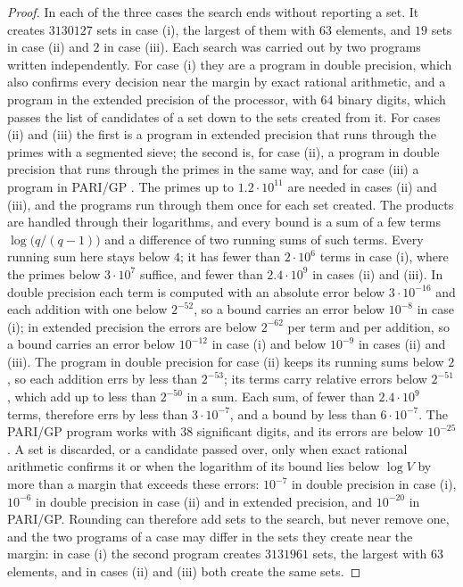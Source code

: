 \documentclass[11pt,reqno]{amsart}
\numberwithin{equation}{section}
\theoremstyle{plain}
\theoremstyle{definition}
\theoremstyle{remark}
\begin{document}
\begin{proof}
In each of the three cases the search ends without reporting a set. It
creates $3130127$ sets in case (i), the largest of them with $63$
elements, and $19$ sets in case (ii) and $2$ in case (iii). Each
search was carried out by two programs written independently. For
case (i) they are a program in double precision, which also confirms
every decision near the margin by exact rational arithmetic, and a
program in the extended precision of the processor, with $64$ binary
digits, which passes the list of candidates of a set down to the sets
created from it. For cases (ii) and (iii) the first is a program in
extended precision that runs through the primes with a segmented
sieve; the second is, for case (ii), a program in double precision
that runs through the primes in the same way, and for case (iii) a
program in PARI/GP \cite{PARI}. The primes up to $1.2\cdot10^{11}$ are needed in
cases (ii) and (iii), and the programs run through them once for each
set created. The products are handled through their logarithms, and
every bound is a sum of a few terms $\log\bigl(q/(q-1)\bigr)$ and a
difference of two running sums of such terms. Every running sum here
stays below $4$; it has fewer than $2\cdot10^6$ terms in case (i),
where the primes below $3\cdot10^7$ suffice, and fewer than
$2.4\cdot10^9$ in cases (ii) and (iii). In double precision each term
is computed with an absolute error below $3\cdot10^{-16}$ and each
addition with one below $2^{-52}$, so a bound carries an error below
$10^{-8}$ in case (i); in extended precision the errors are below
$2^{-62}$ per term and per addition, so a bound carries an error
below $10^{-12}$ in case (i) and below $10^{-9}$ in cases (ii) and
(iii). The program in double precision for case (ii) keeps its running
sums below $2$, so each addition errs by less than $2^{-53}$; its terms
carry relative errors below $2^{-51}$, which add up to less than
$2^{-50}$ in a sum. Each sum, of fewer than $2.4\cdot10^9$ terms,
therefore errs by less than $3\cdot10^{-7}$, and a bound by less than
$6\cdot10^{-7}$. The PARI/GP
program works with $38$ significant digits, and its errors are below
$10^{-25}$. A set is discarded, or a candidate passed
over, only when exact rational arithmetic confirms it or when the
logarithm of its bound lies below $\log V$ by more than a margin that
exceeds these errors: $10^{-7}$ in double precision in case (i),
$10^{-6}$ in double precision in case (ii) and in extended precision,
and $10^{-20}$ in PARI/GP. Rounding can therefore
add sets to the search, but never remove one, and the two programs of
a case may differ in the sets they create near the margin: in case (i)
the second program creates $3131961$ sets, the largest with $63$
elements, and in cases (ii) and (iii) both create the same sets.
\end{proof}
\end{document}
